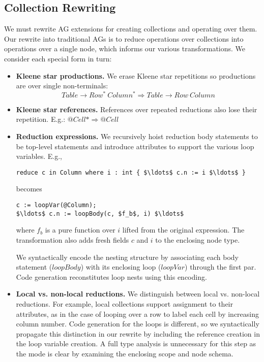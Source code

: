 
\subsection{Collection Rewriting}

We must rewrite AG extensions for creating collections and operating over them. Our rewrite into traditional AGs is to reduce operations over collections into operations over a single node, which informs our various transformations. We consider each special form in turn:

\begin{itemize}
\item \textbf{Kleene star productions. } We erase Kleene star repetitions so productions are over single non-terminals:
$$Table \rightarrow Row^{*} ~ Column^{*} \Rightarrow Table \rightarrow Row~Column$$
\item \textbf{Kleene star references.} References over repeated reductions also lose their repetition. E.g.: $@Cell* \Rightarrow @Cell$
\item \textbf{Reduction expressions.} We recursively hoist reduction body statements to be top-level statements and introduce attributes to support the various loop variables. E.g., 

\begin{lstlisting}[mathescape]
reduce c in Column where i : int { $\ldots$ c.n := i $\ldots$ }
\end{lstlisting}

becomes 

\begin{lstlisting}[mathescape]
c := loopVar(@Column);
$\ldots$ c.n := loopBody(c, $f_b$, i) $\ldots$
\end{lstlisting}

where $f_b$ is a pure function over $i$ lifted from the original expression. The transformation also adds fresh fields $c$ and $i$ to the enclosing node type. 

We syntactically encode the nesting structure by associating each body statement ($loopBody$) with its enclosing loop ($loopVar$) through the first par. Code generation  reconstitutes loop nests using this encoding. 
\item \textbf{Local vs. non-local reductions. } We distinguish between local vs. non-local reductions. For example, local collections support assignment to their attributes, as in the case of looping over a row to label each cell by increasing column number. Code generation for the loops is different, so we syntactically  propagate this distinction in our rewrite by including the reference creation in the loop variable creation. A full type analysis is unnecessary for this step as the mode is clear by examining the enclosing scope and node schema.
\end{itemize}

